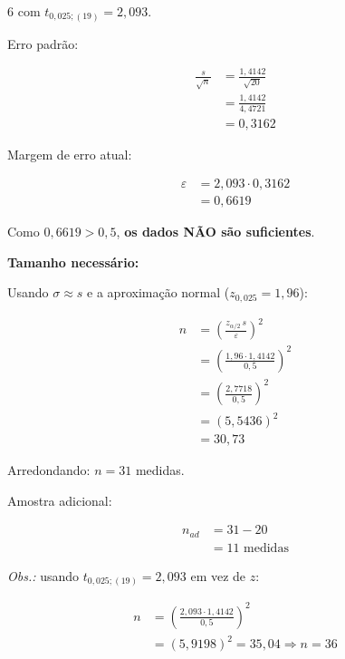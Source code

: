 \documentclass[8pt, a4paper, landscape]{extarticle}
\begin{document}
\begin{multicols}{6}
com $t_{0,025;(19)} = 2,093$.

Erro padrão:

\begin{equation*}
\begin{split}
\frac{s}{\sqrt{n}} &= \frac{1,4142}{\sqrt{20}} \\
&= \frac{1,4142}{4,4721} \\
&= 0,3162
\end{split}
\end{equation*}

Margem de erro atual:

\begin{equation*}
\begin{split}
\varepsilon &= 2,093 \cdot 0,3162 \\
&= 0,6619
\end{split}
\end{equation*}

Como $0,6619 > 0,5$, \textbf{os dados NÃO são suficientes}.

\vspace{0.2cm}

\textbf{Tamanho necessário:}

Usando $\sigma \approx s$ e a aproximação normal ($z_{0,025} = 1,96$):

\begin{equation*}
\begin{split}
n &= \left(\frac{z_{\alpha/2}\,s}{\varepsilon}\right)^2 \\
&= \left(\frac{1,96 \cdot 1,4142}{0,5}\right)^2 \\
&= \left(\frac{2,7718}{0,5}\right)^2 \\
&= (5,5436)^2 \\
&= 30,73
\end{split}
\end{equation*}

Arredondando: $n = 31$ medidas.

Amostra adicional:

\begin{equation*}
\begin{split}
n_{ad} &= 31 - 20 \\
&= 11 \text{ medidas}
\end{split}
\end{equation*}

\textit{Obs.:} usando $t_{0,025;(19)} = 2,093$ em vez de $z$:

\begin{equation*}
\begin{split}
n &= \left(\frac{2,093 \cdot 1,4142}{0,5}\right)^2 \\
&= (5,9198)^2 = 35,04 \Rightarrow n = 36
\end{split}
\end{equation*}


\end{multicols}
\end{document}
